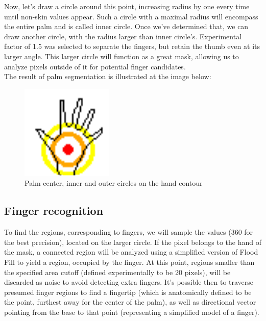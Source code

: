 \documentclass[a4paper,11pt,oneside]{article}
\begin{document}
  Now, let's draw a circle around this point, increasing radius by one every time until non-skin values appear. Such a circle with a maximal radius will encompass the entire palm and is called inner circle. Once we've determined that, we can draw another circle, with the radius larger than inner circle's. Experimental factor of 1.5 was selected to separate the fingers, but retain the thumb even at its larger angle. This larger circle will function as a great mask, allowing us to analyze pixels outside of it for potential finger candidates.\\

The result of palm segmentation is illustrated at the image below:\\

  \begin{figure}[H]
  \centering
  \includegraphics[scale=1.5]{hand-circles.png}
\caption{Palm center, inner and outer circles on the hand contour}
\end{figure}


\subsection{Finger recognition}

To find the regions, corresponding to fingers, we will sample the values (360 for the best precision), located on the larger circle. If the pixel belongs to the hand of the mask, a connected region will be analyzed using a simplified version of Flood Fill to yield a region, occupied by the finger. At this point, regions smaller than the specified area cutoff (defined experimentally to be 20 pixels), will be discarded as noise to avoid detecting extra fingers. It's possible then to traverse presumed finger regions to find a fingertip (which is anatomically defined to be the point, furthest away for the center of the palm), as well as directional vector pointing from the base to that point (representing a simplified model of a finger).\\
\end{document}
